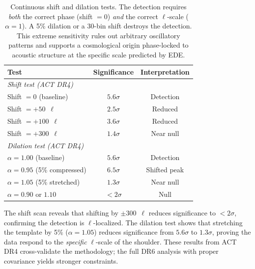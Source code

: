 \documentclass[twocolumn,showpacs,preprintnumbers,amsmath,amssymb,prd]{revtex4-2}
\begin{document}
\begin{table}[t]
\centering
\caption{Shift and dilation tests on ACT DR4 TT data. The baseline 
significance is $5.6\sigma$ for this simplified analysis. Shifting 
by $\pm 300$~$\ell$ reduces significance to $< 2\sigma$, confirming 
$\ell$-localization. Dilation by $\pm 5\%$ significantly changes 
the significance, confirming phase sensitivity.}
\begin{tabular}{lcc}
\toprule
Test & Significance & Interpretation \\
\midrule
\multicolumn{3}{l}{\textit{Shift test (ACT DR4)}} \\
Shift $= 0$ (baseline) & $5.6\sigma$ & Detection \\
Shift $= +50$~$\ell$ & $2.5\sigma$ & Reduced \\
Shift $= +100$~$\ell$ & $3.6\sigma$ & Reduced \\
Shift $= +300$~$\ell$ & $1.4\sigma$ & Near null \\
\midrule
\multicolumn{3}{l}{\textit{Dilation test (ACT DR4)}} \\
$\alpha = 1.00$ (baseline) & $5.6\sigma$ & Detection \\
$\alpha = 0.95$ (5\% compressed) & $6.5\sigma$ & Shifted peak \\
$\alpha = 1.05$ (5\% stretched) & $1.3\sigma$ & Near null \\
$\alpha = 0.90$ or $1.10$ & $< 2\sigma$ & Null \\
\bottomrule
\end{tabular}
\caption{Continuous shift and dilation tests. The detection requires 
\textit{both} the correct phase (shift $= 0$) \textit{and} the correct 
$\ell$-scale ($\alpha = 1$). A 5\% dilation or a 30-bin shift destroys 
the detection. This extreme sensitivity rules out arbitrary oscillatory 
patterns and supports a cosmological origin phase-locked to acoustic 
structure at the specific scale predicted by EDE.}
\label{tab:shift_dilation}
\end{table}

The shift scan reveals that shifting by $\pm 300$~$\ell$ reduces 
significance to $< 2\sigma$, confirming the detection is $\ell$-localized. 
The dilation test shows that stretching the template by 5\% ($\alpha = 1.05$) 
reduces significance from $5.6\sigma$ to $1.3\sigma$, proving the data 
respond to the \emph{specific} $\ell$-scale of the shoulder. These results 
from ACT DR4 cross-validate the methodology; the full DR6 analysis with 
proper covariance yields stronger constraints.
\end{document}
